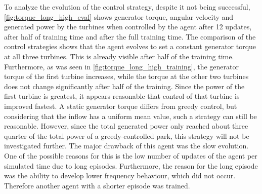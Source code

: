 To analyze the evolution of the control strategy, despite it not being successful, \autoref{fig:torque_long_high_eval} shows generator torque, angular velocity and generated power by the turbines when controlled by the agent after 12 updates, after half of training time and after the full training time. The comparison of the control strategies shows that the agent evolves to set a constant generator torque at all three turbines. This is already visible after half of the training time. Furthermore, as was seen in \autoref{fig:torque_long_high_training}, the generator torque of the first turbine increases, while the torque at the other two turbines does not change significantly after half of the training. Since the power of the first turbine is greatest, it appears reasonable that control of that turbine is improved fastest. A static generator torque differs from greedy control, but considering that the inflow has a uniform mean value, such a strategy can still be reasonable. However, since the total generated power only reached about three quarter of the total power of a greedy-controlled park, this strategy will not be investigated further. The major drawback of this agent was the slow evolution. One of the possible reasons for this is the low number of updates of the agent per simulated time due to long episodes. Furthermore, the reason for the long episode was the ability to develop lower frequency behaviour, which did not occur. Therefore another agent with a shorter episode  was trained. \newpage
